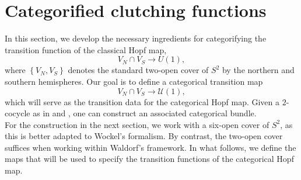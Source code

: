 \documentclass{article}
\theoremstyle{plain}
\theoremstyle{definition}
\begin{document}
%
\section{Categorified clutching functions}
In this section, we develop the necessary ingredients for categorifying the transition function of the classical Hopf map,
\[
V_N \cap V_S \longrightarrow U(1),
\]
where $\left\{V_N,V_S\right\}$ denotes the standard two-open cover of $S^2$ by the northern and southern hemispheres. Our goal is to define a categorical transition map
$$V_N \cap V_S \longrightarrow \mathcal{U}(1),$$
which will serve as the transition data for the categorical Hopf map. Given a $2$-cocycle as in \cite{MR3894086} and \cite{MR2805195}, one can construct an associated categorical bundle. \\
For the construction in the next section, we work with a six-open cover of $S^2$, as this is better adapted to Wockel’s formalism. By contrast, the two-open cover suffices when working within Waldorf’s framework. In what follows, we define the maps that will be used to specify the transition functions of the categorical Hopf map.
\end{document}
